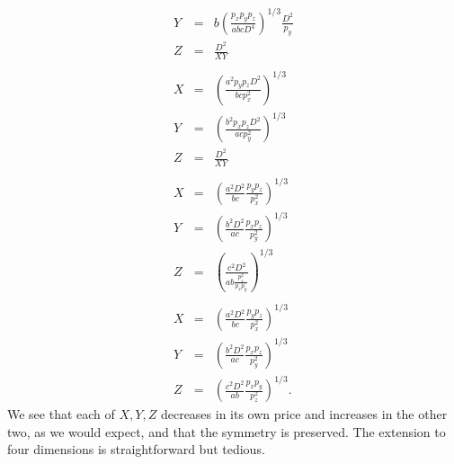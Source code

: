 \documentclass[12pt]{book}
\begin{document}
\begin{eqnarray*}
Y                        &=& b\left(\frac{p_xp_yp_z}{abcD^4}\right)^{1/3} \frac{D^2}{p_y} \\
Z                        &=& \frac{D^2}{XY} \\
\\
X                        &=& \left(\frac{a^2p_yp_zD^2}{bcp_x^2}\right)^{1/3}  \\
Y                        &=& \left(\frac{b^2p_xp_zD^2}{acp_y^2}\right)^{1/3}  \\
Z                        &=& \frac{D^2}{XY}\\
\\
X                        &=& \left(\frac{a^2D^2}{bc}\frac{p_yp_z}{p_x^2}\right)^{1/3} \\
Y                        &=& \left(\frac{b^2D^2}{ac}\frac{p_xp_z}{p_y^2}\right)^{1/3} \\
Z                        &=& \left(\frac{c^2D^2}{ab\frac{p_z^2}{p_xp_y}}\right)^{1/3} \\
\\
X                        &=& \left(\frac{a^2D^2}{bc}\frac{p_yp_z}{p_x^2}\right)^{1/3}  \\
Y                        &=& \left(\frac{b^2D^2}{ac}\frac{p_xp_z}{p_y^2}\right)^{1/3}  \\
Z                        &=& \left(\frac{c^2D^2}{ab}\frac{p_xp_y}{p_z^2}\right)^{1/3}.
\end{eqnarray*}
We see that each of $X, Y, Z$ decreases in its own price and increases
in the other two, as we would expect, and that the symmetry is preserved.
The extension to four dimensions is straightforward but tedious.
\end{document}
